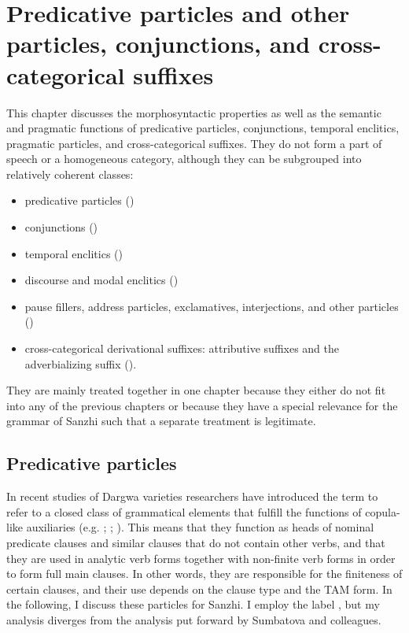 \chapter[Particles, conjunctions, and cross-categorical suffixes]{Predicative particles and other particles, conjunctions, and cross-categorical suffixes}
\label{cpt:Minor parts of speech}

This chapter discusses the morphosyntactic properties as well as the semantic and pragmatic functions of predicative particles, conjunctions, temporal enclitics, pragmatic particles, and cross-categorical suffixes. They do not form a part of speech or a homogeneous category, although they can be subgrouped into relatively coherent classes:
%
\begin{itemize}
	\item	predicative particles ()
	\item	conjunctions ()
	\item  temporal enclitics ()
	\item	discourse and modal enclitics ()
	\item	pause fillers, address particles, exclamatives, interjections, and other particles ()
	\item	cross-categorical derivational suffixes: attributive suffixes and the adverbializing suffix ().
\end{itemize}

They are mainly treated together in one chapter because they either do not fit into any of the previous chapters or because they have a special relevance for the grammar of Sanzhi such that a separate treatment is legitimate.

\section{Predicative particles}
\label{sec:Predicative particles}

In recent studies of Dargwa varieties researchers have introduced the term  to refer to a closed class of grammatical elements that fulfill the functions of copula-like auxiliaries (e.g. ; ; ). This means that they function as heads of nominal predicate clauses and similar clauses that do not contain other verbs, and that they are used in analytic verb forms together with non-finite verb forms in order to form full main clauses. In other words, they are responsible for the finiteness of certain clauses, and their use depends on the clause type and the TAM form. In the following, I discuss these particles for Sanzhi. I employ the label , but my analysis diverges from the analysis put forward by Sumbatova and colleagues.

